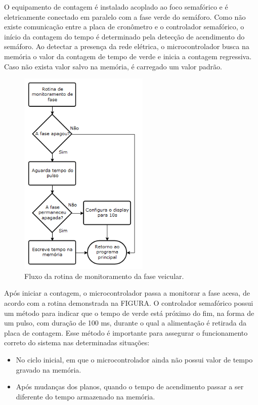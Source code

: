 O equipamento de contagem é instalado acoplado ao foco semafórico e é eletricamente conectado em paralelo com a fase verde do semáforo. Como não existe comunicação entre a placa de cronômetro e o controlador semafórico, o início da contagem do tempo é determinado pela detecção de acendimento do semáforo. Ao detectar a presença da rede elétrica, o microcontrolador busca na memória o valor da contagem de tempo de verde e inicia a contagem regressiva. Caso não exista valor salvo na memória, é carregado um valor padrão.

\begin{figure}[ht]
    \begin{center}
    \includegraphics{figuras/fluxo_cron2.PNG}
    \end{center}
    \caption[Fluxograma do monitoramento do cronômetro]{Fluxo da rotina de monitoramento da fase veicular.}
    \label{fluxo_cron2}
\end{figure}

Após iniciar a contagem, o microcontrolador passa a monitorar a fase acesa, de acordo com a rotina demonstrada na FIGURA. O controlador semafórico possui um método para indicar que o tempo de verde está próximo do fim, na forma de um pulso, com duração de 100 ms, durante o qual a alimentação é retirada da placa de contagem. Esse método é importante para assegurar o funcionamento correto do sistema nas determinadas situações:

\begin{itemize}
\item No ciclo inicial, em que o microcontrolador ainda não possui valor de tempo gravado na memória.
\item Após mudanças dos planos, quando o tempo de acendimento passar a ser diferente do tempo armazenado na memória.
\end{itemize}

